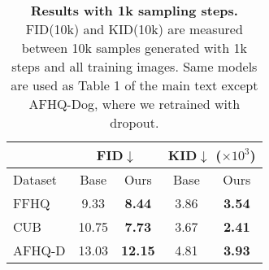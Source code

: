 \begin{table}[]
\centering
\begin{tabular}{l|cc|cc}
\hline
         & \multicolumn{2}{c|}{FID$\downarrow$} & \multicolumn{2}{c}{KID$\downarrow$ ($\times 10^3$)} \\ \hline
Dataset  & Base      & Ours              & Base     & Ours               \\ \hline
FFHQ     &    9.33   &  \textbf{8.44}    &   3.86   &  \textbf{3.54}     \\
CUB      &    10.75  & \textbf{7.73}     &   3.67    & \textbf{2.41}      \\ 
AFHQ-D   & 13.03   &   \textbf{12.15}   &    4.81     &    \textbf{3.93}   \\ \hline

\end{tabular}
\vspace{-0.8em}
\caption{\textbf{Results with 1k sampling steps.} FID(10k) and KID(10k) are measured between 10k samples generated with 1k steps and all training images. Same models are used as Table 1 of the main text except AFHQ-Dog, where we retrained with dropout. %
}
\vspace{-1.5em}
\label{table:fid_rebuttal}
\end{table}